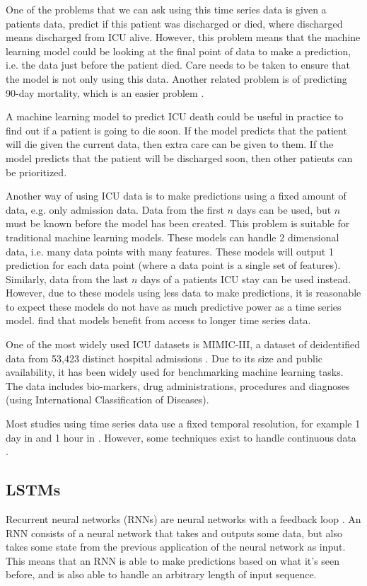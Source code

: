 \documentclass[12pt]{article}
\begin{document}
One of the problems that we can ask using this time series data is given a patients data, predict if this patient was discharged or died, where discharged means discharged from ICU alive. However, this problem means that the machine learning model could be looking at the final point of data to make a prediction, i.e. the data just before the patient died. Care needs to be taken to ensure that the model is not only using this data. Another related problem is of predicting 90-day mortality, which is an easier problem \cite{ICUFancyLSTM}.

A machine learning model to predict ICU death could be useful in practice to find out if a patient is going to die soon. If the model predicts that the patient will die given the current data, then extra care can be given to them. If the model predicts that the patient will be discharged soon, then other patients can be prioritized.

Another way of using ICU data is to make predictions using a fixed amount of data, e.g. only admission data. Data from the first $n$ days can be used, but $n$ must be known before the model has been created. This problem is suitable for traditional machine learning models. These models can handle 2 dimensional data, i.e. many data points with many features. These models will output 1 prediction for each data point (where a data point is a single set of features). Similarly, data from the last $n$ days of a patients ICU stay can be used instead. However, due to these models using less data to make predictions, it is reasonable to expect these models do not have as much predictive power as a time series model. \cite{KajiLSTM,ICUFancyLSTM} find that models benefit from access to longer time series data.

One of the most widely used ICU datasets is MIMIC-III, a dataset of deidentified data from 53,423 distinct hospital admissions \cite{MIMICIIIdatabase}. Due to its size and public availability, it has been widely used for benchmarking machine learning tasks. The data includes bio-markers, drug administrations, procedures and diagnoses (using International Classification of Diseases).

Most studies using time series data use a fixed temporal resolution, for example 1 day in \cite{KajiLSTM} and 1 hour in \cite{ICUFancyLSTM}. However, some techniques exist to handle continuous data \cite{GRUODE}.

\subsection{LSTMs}
Recurrent neural networks (RNNs) are neural networks with a feedback loop \cite{ColahLSTM}. An RNN consists of a neural network that takes and outputs some data, but also takes some state from the previous application of the neural network as input. This means that an RNN is able to make predictions based on what it's seen before, and is also able to handle an arbitrary length of input sequence.
\end{document}
